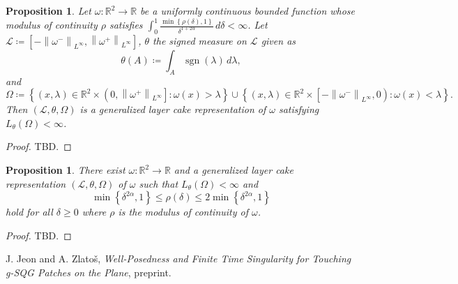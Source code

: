 \documentclass[reqno,centertags,12pt]{amsart}
\newtheorem{proposition}[theorem]{Proposition}
\theoremstyle{definition}
\numberwithin{equation}{section}
\newcommand{\norm}[1]{\left\|#1\right\|}
\newcommand{\set}[1]{\left\{ #1 \right\}}
\newcommand{\bbR}{{\mathbb{R}}}
\newcommand{\tht}{\theta}
\begin{document}
\begin{proposition}
    Let $\omega\colon\bbR^{2}\to\bbR$ be a uniformly continuous bounded function
    whose modulus of continuity $\rho$ satisfies
    $\int_{0}^{1}\frac{\min\set{\rho(\delta),1}}{\delta^{1+2\alpha}}\,d\delta < \infty$.
    Let $\mathcal{L}\coloneqq \left[
        -\norm{\omega^{-}}_{L^{\infty}},
        \norm{\omega^{+}}_{L^{\infty}}
    \right]$, $\theta$ the signed measure on $\mathcal{L}$ given as
    \[
        \theta(A) \coloneqq \int_{A}\operatorname{sgn}(\lambda)\,d\lambda,
    \]
    and
    \[
        \Omega\coloneqq \set{(x,\lambda)\in
        \bbR^{2}\times\left(0,\norm{\omega^{+}}_{L^{\infty}}\right]
        \colon
        \omega(x) > \lambda}
        \cup
        \set{(x,\lambda)\in
        \bbR^{2}\times\left[-\norm{\omega^{-}}_{L^{\infty}},0\right)
        \colon
        \omega(x) < \lambda}.
    \]
    Then $(\mathcal{L},\theta,\Omega)$ is a generalized layer cake representation of $\omega$
    satisfying $L_{\tht}(\Omega) < \infty$.
\end{proposition}

\begin{proof}
    TBD.
\end{proof}

\begin{proposition}
    There exist $\omega\colon\bbR^{2}\to\bbR$ and
    a generalized layer cake representation $(\mathcal{L},\theta,\Omega)$ of $\omega$
    such that $L_{\tht}(\Omega)<\infty$ and
    \[
        \min\left\{\delta^{2\alpha},1\right\}
        \leq \rho(\delta) \leq
        2\min\left\{\delta^{2\alpha},1\right\}
    \]
    hold for all $\delta\geq 0$ where $\rho$ is the modulus of continuity of $\omega$.
\end{proposition}

\begin{proof}
    TBD.
\end{proof}




\begin{thebibliography}{10}

J. Jeon and A. Zlato\v{s},
\textit{Well-Posedness and Finite Time Singularity for Touching g-SQG Patches on the Plane},
preprint.


\end{thebibliography}
\end{document}
